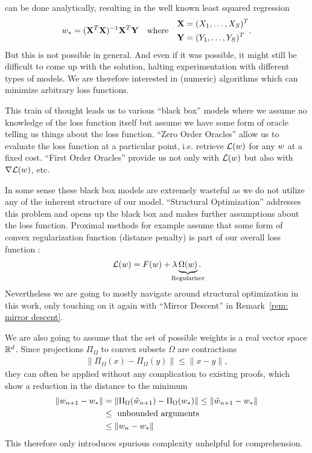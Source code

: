 can be done analytically, resulting in the well known least squared
regression
\begin{align*}
	w_* = (\mathbf{X}^T\mathbf{X})^{-1}\mathbf{X}^T\mathbf{Y} \quad \text{where}\quad 
	\begin{aligned}
		\mathbf{X}&=(X_1,\dots,X_S)^T\\
		\mathbf{Y}&=(Y_1,\dots,Y_S)^T
	\end{aligned}.
\end{align*}
But this is not possible in general. And even if it was possible, it might still
be difficult to come up with the solution, halting experimentation
with different types of models. We are therefore interested in (numeric)
algorithms which can minimize arbitrary loss functions.

This train of thought leads us to various ``black box'' models where we assume
no knowledge of the loss function itself but assume we have some form of oracle
telling us things about the loss function. ``Zero Order Oracles'' allow us to
evaluate the loss function at a particular point, i.e. retrieve \(\mathcal{L}(w)\)
for any \(w\) at a fixed cost. ``First Order Oracles'' provide us not
only with \(\mathcal{L}(w)\) but also with \(\nabla\mathcal{L}(w)\), etc.

In some sense these black box models are extremely wasteful as we do not utilize
any of the inherent structure of our model. ``Structural Optimization'' addresses
this problem and opens up the black box and makes further assumptions about
the loss function. Proximal methods for example assume that some form of convex
regularization function (distance penalty) is part of our overall loss
function \parencite[see e.g.][]{bottouOptimizationMethodsLargeScale2018}:
\begin{align*}
	\Loss(\weights)
	= F(\weights) + \lambda \underbrace{\Omega(\weights)}_{\mathclap{\text{Regularizer}}}.
\end{align*}
Nevertheless we are going to mostly navigate around structural optimization in
this work, only touching on it again with ``Mirror Descent'' in
Remark~\ref{rem: mirror descent}.

We are also going to assume that the set of possible weights is a real
vector space \(\mathbb{R}^d\). Since projections \(\Pi_\Omega\) to convex
subsets \(\Omega\) are contractions \parencite[Lemma
3.1]{bubeckConvexOptimizationAlgorithms2015}
\begin{align*}
	\| \Pi_\Omega(x) - \Pi_\Omega(y) \| \le \| x - y \|,
\end{align*}
they can often be applied without any complication to existing proofs, which show
a reduction in the distance to the minimum
\begin{align*}
	\|w_{n+1} - w_* \|
	&= \|\Pi_\Omega(\tilde{w}_{n+1}) - \Pi_\Omega(w_*)\|
	\le \|\tilde{w}_{n+1} - w_* \|\\
	&\le \text{ unbounded arguments }\\
	&\le \|w_n - w_*\|
\end{align*}
This therefore only introduces spurious complexity unhelpful for comprehension.

